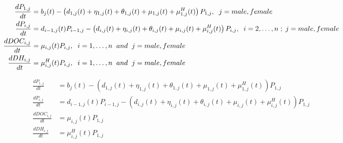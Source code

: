 \documentclass[
]{jss}
\begin{document}
\begin{small}
\begin{equation}\label{eq:si_hp_ode}
\begin{split}
\frac{dP_{1, j}}{dt} & = b_{j}(t) - \left(d_{1, j}(t)+ \eta_{1, j}(t) + \theta_{1, j}(t) + \mu_{1, j}(t) + \mu_{1, j}^{H}(t)\right) P_{1, j},  \hspace{0.2cm} j = male, female\\
\frac{dP_{i, j}}{dt} & = d_{i-1, j}(t)P_{i-1, j} - \left(d_{i, j}(t) + \eta_{i, j}(t) +         \theta_{i, j}(t) + \mu_{i, j}(t) + \mu_{i, j}^{H}(t)\right) P_{i, j}, \hspace{0.2cm} i=2,\ldots,n \hspace{0.1cm} ; \hspace{0.1cm} j = male, female \\
\frac{dDOC_{i, j}}{dt} & = \mu_{i, j}(t) P_{i, j}, \hspace{0.2cm} i = 1,\ldots, n \hspace{0.2cm} and \hspace{0.2cm} j = male, female \\ %
\frac{dDH_{i, j}}{dt} & = \mu^{H}_{i, j}(t) P_{i, j}, \hspace{0.2cm} i = 1, \ldots, n  \hspace{0.2cm} and \hspace{0.2cm} j = male, female %
\end{split}
\end{equation}
\end{small}

\begin{small}
\begin{equation}\label{eq:si_hp_ode}
\begin{split}
\frac{dP_{1, j}}{dt} & = b_{j}(t) - \left(d_{1, j}(t)+ \eta_{1, j}(t) + \theta_{1, j}(t) + \mu_{1, j}(t) + \mu_{1, j}^{H}(t)\right) P_{1, j} \\
\frac{dP_{i, j}}{dt} & = d_{i-1, j}(t)P_{i-1, j} - \left(d_{i, j}(t) + \eta_{i, j}(t) +         \theta_{i, j}(t) + \mu_{i, j}(t) + \mu_{i, j}^{H}(t)\right) P_{1, j} \\
\frac{dDOC_{i, j}}{dt} & = \mu_{i, j}(t) P_{1, j} \\
\frac{dDH_{i, j}}{dt} & = \mu^{H}_{i, j}(t) P_{1, j} \\
\end{split}
\end{equation}
\end{small}
\end{document}
